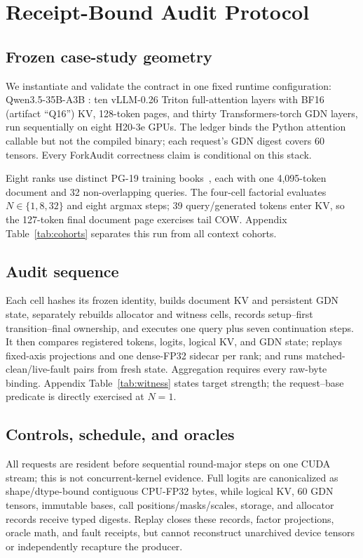 \documentclass{article}
\begin{document}
\section{Receipt-Bound Audit Protocol}
\label{sec:protocol}

\subsection{Frozen case-study geometry}

We instantiate and validate the contract in one fixed runtime configuration:
Qwen3.5-35B-A3B
\citep{qwen2026qwen35,qwen2026qwen35modelcard}: ten vLLM-0.26 Triton
full-attention layers with BF16 (artifact ``Q16'') KV, 128-token pages, and
thirty Transformers-torch GDN layers, run sequentially on eight H20-3e GPUs.
The ledger binds the Python attention callable but not the compiled binary;
each request's GDN digest covers 60 tensors.  Every ForkAudit correctness claim
is conditional on this stack.

Eight ranks use distinct PG-19 training books~\citep{rae2020compressive}, each
with one 4,095-token document and 32 non-overlapping queries.  The four-cell
factorial evaluates $N\in\{1,8,32\}$ and eight argmax steps; 39 query/generated
tokens enter KV, so the 127-token final document page exercises tail COW.
Appendix Table~\ref{tab:cohorts} separates this run from all context cohorts.

\subsection{Audit sequence}

Each cell hashes its frozen identity, builds document KV and persistent GDN
state, separately rebuilds allocator and witness cells, records setup--first
transition--final ownership, and executes one query plus seven continuation
steps.  It then compares registered tokens, logits, logical KV, and GDN state;
replays fixed-axis projections and one dense-FP32 sidecar per rank; and runs
matched-clean/live-fault pairs from fresh state.  Aggregation requires every
raw-byte binding.  Appendix Table~\ref{tab:witness} states target strength;
the request--base predicate is directly exercised at $N=1$.

\subsection{Controls, schedule, and oracles}

All requests are resident before sequential round-major steps on one CUDA
stream; this is not concurrent-kernel evidence.  Full logits are canonicalized
as shape/dtype-bound contiguous CPU-FP32 bytes, while logical KV, 60 GDN
tensors, immutable bases, call positions/masks/scales, storage, and allocator
records receive typed digests.  Replay closes these records, factor projections,
oracle math, and fault receipts, but cannot reconstruct unarchived device
tensors or independently recapture the producer.
\end{document}
